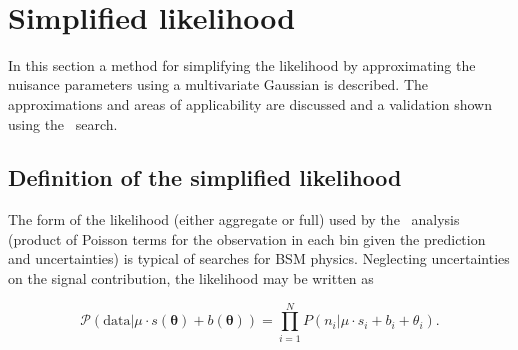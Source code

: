 \begin{figure}[!tbhp]
\begin{center}
     \\
  \end{center}
\end{figure}

\section{Simplified likelihood}

In this section a method for simplifying the likelihood by approximating the nuisance parameters
using a multivariate Gaussian is described. The approximations and areas of applicability 
are discussed and a validation shown using the \alphat~search.

\subsection{Definition of the simplified likelihood}

The form of the likelihood (either aggregate or full) used by the \alphat~analysis (product of Poisson terms 
for the observation in each bin given the prediction and uncertainties)
is typical of searches for BSM physics. Neglecting uncertainties on the signal contribution,
the likelihood may be written as 

\begin{equation}
\mathcal{P}(\mathrm{data}|\mu\cdot s(\boldsymbol{\theta}) + b(\boldsymbol{\theta})) = \prod_{i=1}^{N} P(n_{i}|\mu \cdot s_{i}+b_{i}+\theta_{i}).
\label{eq:poisson-prob}
\end{equation}

